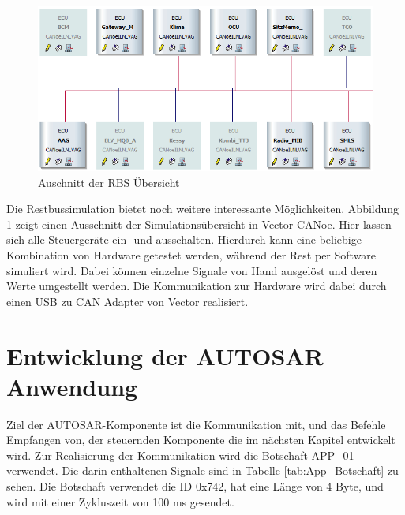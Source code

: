 \documentclass[
  a4paper,					    %
  twoside,
  DIV=calc,     				%
  bibliography=totoc,
  cleardoublepage=empty,
  ngerman,     					%
  final       					%
]{scrbook}
\begin{document}
\begin{figure}[ht]
    \centering
    \includegraphics[width=\textwidth]{rbs_ausschnitt}
    \caption{Auschnitt der RBS Übersicht}
    \label{fig:rbs}
\end{figure}

Die Restbussimulation bietet noch weitere interessante Möglichkeiten. Abbildung \ref{fig:rbs} zeigt einen Ausschnitt der Simulationsübersicht in Vector CANoe. Hier lassen sich alle Steuergeräte ein- und ausschalten. Hierdurch kann eine beliebige Kombination von Hardware getestet werden, während der Rest per Software simuliert wird. Dabei können einzelne Signale von Hand ausgelöst und deren Werte umgestellt werden. Die Kommunikation zur Hardware wird dabei durch einen USB zu CAN Adapter von Vector realisiert.










\section{Entwicklung der AUTOSAR Anwendung}
\label{sec:entwicklung_autosar}
Ziel der AUTOSAR-Komponente ist die Kommunikation mit, und das Befehle Empfangen von, der steuernden Komponente die im nächsten Kapitel entwickelt wird. Zur Realisierung der Kommunikation wird die Botschaft APP\_01 verwendet. Die darin enthaltenen Signale sind in Tabelle \ref{tab:App_Botschaft} zu sehen. Die Botschaft verwendet die ID 0x742, hat eine Länge von 4 Byte, und wird mit einer Zykluszeit von 100 ms gesendet.
\end{document}
